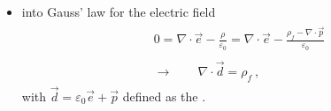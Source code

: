 \documentclass[letterpaper,10pt,english]{jupyterBook}
\begin{document}
\begin{itemize}
\item {} 
\sphinxAtStartPar
into Gauss’ law for the electric field
\begin{equation*}
\begin{split}\begin{aligned}
    & 0  = \nabla \cdot \vec{e} - \frac{\rho}{\varepsilon_0} = \nabla \cdot \vec{e} - \frac{\rho_f - \nabla \cdot \vec{p}}{\varepsilon_0}  \\ \\
    & \rightarrow \qquad \nabla \cdot \vec{d} = \rho_f \ ,
  \end{aligned}\end{split}
\end{equation*}
\sphinxAtStartPar
with \(\vec{d} = \varepsilon_0 \vec{e} + \vec{p}\) defined as the .


\end{itemize}
\end{document}
